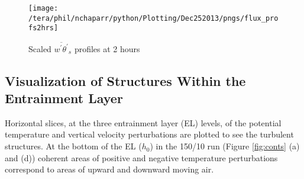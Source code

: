 \begin{figure}[htbp]
    \centering
    \texttt{[image: /tera/phil/nchaparr/python/Plotting/Dec252013/pngs/flux\_profs2hrs]}
    \caption{Scaled $\overline{w^{'}\theta^{'}}_{s}$ profiles at 2 hours}
    \label{fig:fluxprofs2hrs}   %
\end{figure}




\clearpage

\subsection{Visualization of Structures Within the Entrainment Layer}
\FloatBarrier

Horizontal slices, at the three entrainment layer (\acs{EL}) levels, of the potential temperature 
and vertical velocity perturbations are plotted to see the turbulent structures.  At the bottom of the \acs{EL} ($h_{0}$) 
in the 150/10 run (Figure \ref{fig:conts} (a) and (d)) coherent areas of positive and negative temperature perturbations 
correspond to areas of upward and downward moving air.\\

